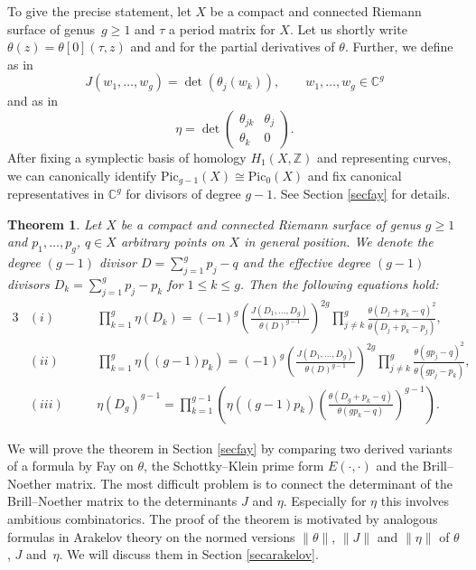 \documentclass[pdftex]{sigma}
\numberwithin{equation}{section}
\newtheorem{Theorem}{Theorem}[section]
\begin{document}
To give the precise statement, let $X$ be a compact and connected Riemann surface of genus~${g\ge 1}$ and $\tau$ a period matrix for $X$. Let us shortly write $\theta(z)=\theta[0](\tau,z)$ and  and  for the partial derivatives of $\theta$. Further, we define as in \cite{Gua99}
\[J(w_1,\dots,w_g)=\det(\theta_j(w_k)),\qquad w_1,\dots,w_g\in \mathbb{C}^g\]
and as in \cite{dJo08}
\[\eta=\det\begin{pmatrix}
	\theta_{jk} & \theta_j\\ \theta_k&0 \end{pmatrix}.\]
After fixing a symplectic basis of homology $H_1(X,\mathbb{Z})$ and representing curves, we can canonically identify $\mathrm{Pic}_{g-1}(X)\cong \mathrm{Pic}_{0}(X)$ and fix canonical representatives in $\mathbb{C}^g$ for divisors of degree $g-1$. See Section \ref{secfay} for details.
\begin{Theorem}\label{mainthm}
	Let $X$ be a compact and connected Riemann surface of genus $g\ge 1$ and $p_1,\dots,p_g$, $q\in X$ arbitrary points on $X$ in general position. We denote the degree $(g-1)$ divisor $D=\sum_{j=1}^g p_j-q$ and the effective degree $(g-1)$ divisors $D_k=\sum_{j=1}^g p_j-p_k$ for $1\le k\le g$. Then the following equations hold:
\begin{alignat*}{3}
& (i)\quad &&\prod_{k=1}^g\eta(D_k)=(-1)^{g}\left(\frac{J(D_1,\dots,D_g)^{}}{\theta(D)^{g-1}}\right)^{2g}\prod_{j\neq k}^g\frac{\theta(D_j+p_k-q)^2}{\theta(D_j+p_k-p_j)},&\\
& (ii) \quad&& \prod_{k=1}^g\eta((g-1)p_k)=(-1)^{g}\left(\frac{J(D_1,\dots,D_g)^{}}{\theta(D)^{g-1}}\right)^{2g}\prod_{j\neq k}^g\frac{\theta(gp_j-q)^2}{\theta(gp_j-p_k)},&\\
& (iii) \quad && \eta(D_g)^{g-1}=\prod_{k=1}^{g-1}\left(\eta((g-1)p_k)\left(\frac{\theta(D_g+p_k-q)}{\theta(gp_k-q)}\right)^{g-1}\right).&
\end{alignat*}
\end{Theorem}
We will prove the theorem in Section \ref{secfay} by comparing two derived variants of a formula by Fay on $\theta$, the Schottky--Klein prime form $E(\cdot,\cdot)$ and the Brill--Noether matrix. The most difficult problem is to connect the determinant of the Brill--Noether matrix to the determinants $J$ and $\eta$. Especially for $\eta$ this involves ambitious combinatorics. The proof of the theorem is motivated by analogous formulas in Arakelov theory on the normed versions $\|\theta\|$, $\|J\|$ and $\|\eta\|$ of $\theta$, $J$ and~$\eta$. We will discuss them in Section \ref{secarakelov}.
\end{document}
